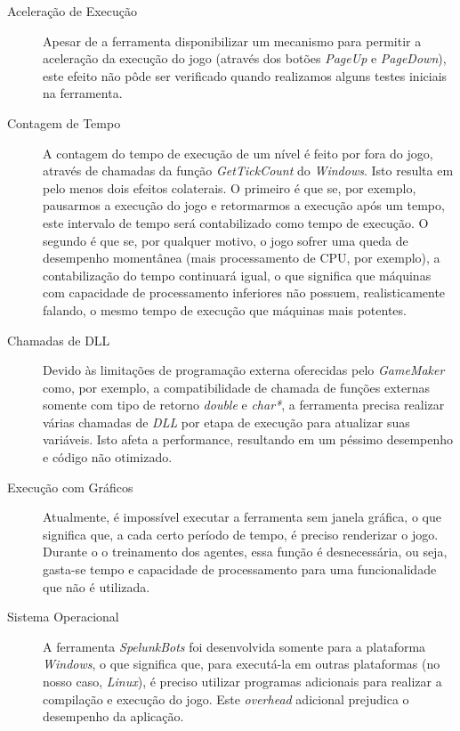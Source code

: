 \begin{description}
	\item[Aceleração de Execução]
		Apesar de a ferramenta disponibilizar um mecanismo para permitir a
		aceleração da execução do jogo (através dos botões \textit{PageUp} e
		\textit{PageDown}), este efeito não pôde ser verificado quando
		realizamos alguns testes iniciais na ferramenta.

	\item[Contagem de Tempo]
		A contagem do tempo de execução de um nível é feito por fora do jogo,
		através de chamadas da função \textit{GetTickCount} do \textit{Windows}.
		Isto resulta em pelo menos dois efeitos colaterais. O primeiro é que se,
		por exemplo, pausarmos a execução do jogo e retormarmos a execução após
		um tempo, este intervalo de tempo será contabilizado como tempo de
		execução. O segundo é que se, por qualquer motivo, o jogo sofrer uma
		queda de desempenho momentânea (mais processamento de CPU, por exemplo),
		a contabilização do tempo continuará igual, o que significa que máquinas
		com capacidade de processamento inferiores não possuem, realisticamente
		falando, o mesmo tempo de execução que máquinas mais potentes.

	\item[Chamadas de DLL]
		Devido às limitações de programação externa oferecidas pelo
		\textit{GameMaker} como, por exemplo, a compatibilidade de chamada de
		funções	externas somente com tipo de retorno \textit{double} e
		\textit{char*}, a ferramenta precisa realizar várias chamadas de
		\textit{DLL} por etapa de execução para atualizar suas variáveis. Isto
		afeta a performance, resultando em um péssimo desempenho e código não
		otimizado.

	\item[Execução com Gráficos]
		Atualmente, é impossível executar a ferramenta sem janela gráfica, o que
		significa que, a cada certo período de tempo, é preciso renderizar o
		jogo. Durante o o treinamento dos agentes, essa função é desnecessária,
		ou seja, gasta-se tempo e capacidade de processamento para uma
		funcionalidade que não é utilizada.

	\item[Sistema Operacional]
		A ferramenta \textit{SpelunkBots} foi desenvolvida somente para a
		plataforma \textit{Windows}, o que significa que, para executá-la em
		outras plataformas (no nosso caso, \textit{Linux}), é preciso utilizar
		programas adicionais para realizar a compilação e execução do jogo. Este
		\textit{overhead} adicional prejudica o desempenho da aplicação.
\end{description}


